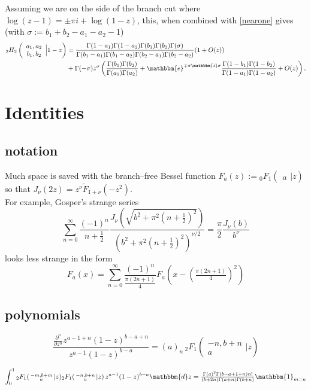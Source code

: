 \documentclass[12pt]{article}
\newcommand{\ee}[0] {\mathbbm{e}}
\newcommand{\ii}[0] {\mathbbm{i}}
\newcommand{\dd}[0] {\mathbbm{d}}
\newcommand{\one}[0] {\mathbbm{1}}
\numberwithin{equation}{section}
\newcommand{\Head}[3] {{}_{#1}{#2}_{#3}}
\newcommand{\ArgS}[3] {( \begin{smallmatrix} #1 \\ #2 \end{smallmatrix} | {#3})}
\newcommand{\HypJ}[2] {F_{#1}(#2)}
\newcommand{\HypJreg}[2] {{\tilde{F}}_{#1}(#2)}
\newcommand{\FF}[6] {{}_{#1}{#2}_{#3} \left( \begin{array}{c} #4 \\ #5 \end{array} \Big| {#6}  \right)}
\begin{document}
Assuming we are on the side of the branch cut where $\log(z-1) = \pm \pi i + \log(1-z)$, this, when combined with \eqref{nearone} gives (with $\sigma := b_1+b_2-a_1-a_2-1$)
\begin{align*}
\FF{2}{H}{2}{a_1,a_2}{b_1,b_2}{1-z} &= \frac{\Gamma(1-a_1)\Gamma(1-a_2)\Gamma(b_1)\Gamma(b_2)\Gamma(\sigma)}{\Gamma(b_1-a_1)\Gamma(b_1-a_2)\Gamma(b_2-a_1)\Gamma(b_2-a_2)}(1 + O(z))\\
&+ \Gamma(-\sigma) z^{\sigma} \left(\frac{\Gamma(b_1)\Gamma(b_2)}{\Gamma(a_1)\Gamma(a_2)} + \ee^{\mp \pi \ii \sigma} \frac{\Gamma(1-b_1)\Gamma(1-b_2)}{\Gamma(1-a_1)\Gamma(1-a_2)} + O(z)\right)\text{.}
\end{align*}



\section{Identities}

\subsection{notation}
Much space is saved with the branch--free Bessel function $\HypJ{a}{z} := \Head{0}{F}{1} \ArgS{}{a}{z}$ so that $J_{\nu}(2z) = z^{\nu} \HypJreg{1+\nu}{-z^2}$.\\
For example, Gosper's strange series
\begin{equation*}
\sum_{n=0}^{\infty} \frac{(-1)^n}{n+\frac12} \frac{J_\nu  \left(\sqrt{b^2 + \pi^2(n+\frac12)^2} \right)}{(b^2 + \pi^2(n+\frac12)^2)^{\nu/2}} = \frac{\pi}{2} \frac{J_{\nu}(b)}{b^\nu}
\end{equation*}
looks less strange in the form
\begin{equation*}
F_a(x) = \sum_{n=0}^{\infty} \frac{(-1)^n}{\tfrac{\pi(2n+1)}{4}} F_a(x-(\tfrac{\pi(2n+1)}{4})^2)
\end{equation*}

\subsection{polynomials}

\begin{equation*}
\frac{\frac{\partial^n}{\partial z^n} z^{a-1+n}(1-z)^{b-a+n}}{z^{a-1}(1-z)^{b-a}} = (a)_n \, \Head{2}{F}{1} \ArgS{-n,b+n}{a}{z}
\end{equation*}

\begin{equation*}
\int_0^1 \Head{2}{F}{1} \ArgS{-m,b+m}{a}{z} \Head{2}{F}{1} \ArgS{-n,b+n}{a}{z} \, z^{a-1}(1-z)^{b-a} \dd z = \tfrac{\Gamma (a)^2 \Gamma(b-a+1+n) n!}{(b+2 n) \Gamma (a+n) \Gamma(b+n)} \one_{m=n}
\end{equation*}
\end{document}
